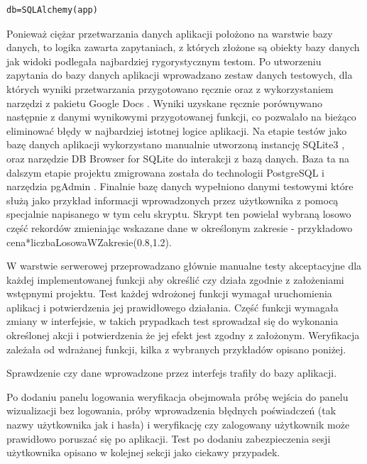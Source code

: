 \documentclass[a4paper, 10pt, twoside, openright]{report}
\begin{document}
\begin{large}
\begin{minipage}{\textwidth}
\begin{lstlisting}
db=SQLAlchemy(app)\end{lstlisting}
\end{minipage}


\medskip
{Ponieważ ciężar przetwarzania danych aplikacji położono na warstwie bazy 
danych, to logika zawarta zapytaniach, z których złożone są obiekty bazy danych 
jak widoki podlegała najbardziej rygorystycznym testom. Po utworzeniu zapytania 
do bazy danych aplikacji wprowadzano zestaw danych testowych, dla których wyniki
 przetwarzania przygotowano ręcznie oraz z wykorzystaniem narzędzi z pakietu 
Google Docs \cite{googledocs}. Wyniki uzyskane ręcznie porównywano następnie z 
danymi wynikowymi przygotowanej funkcji, co pozwalało na bieżąco eliminować 
błędy w najbardziej istotnej logice aplikacji. Na etapie testów jako bazę danych
 aplikacji wykorzystano manualnie utworzoną instancję SQLite3 \cite{SQLite}, 
oraz narzędzie DB Browser for SQLite \cite{DBBrowser} do interakcji z bazą 
danych. Baza ta na dalszym etapie projektu zmigrowana została do technologii 
PostgreSQL \cite{PostgreSQL} i narzędzia pgAdmin \cite{pgAdmin}. Finalnie bazę 
danych wypełniono danymi testowymi które służą jako przykład informacji 
wprowadzonych przez użytkownika z pomocą specjalnie napisanego w tym celu 
skryptu. Skrypt ten powielał wybraną losowo część rekordów zmieniając wskazane 
dane w określonym zakresie - przykładowo cena*liczbaLosowaWZakresie(0.8,1.2).}

\medskip
{W warstwie serwerowej przeprowadzano głównie manualne testy akceptacyjne dla 
każdej implementowanej funkcji aby określić czy działa zgodnie z założeniami 
wstępnymi projektu. Test każdej wdrożonej funkcji wymagał uruchomienia 
aplikacj i potwierdzenia jej prawidłowego działania. Część funkcji wymagała 
zmiany w interfejsie, w takich prypadkach test sprowadzał się do wykonania 
określonej akcji i potwierdzenia że jej efekt jest zgodny z założonym. 
Weryfikacja zależała od wdrażanej funkcji, kilka z wybranych przykładów opisano 
poniżej.}

{Sprawdzenie czy dane wprowadzone przez interfejs trafiły do bazy aplikacji.}

{Po dodaniu panelu logowania weryfikacja obejmowała próbę wejścia do panelu 
wizualizacji bez logowania, próby wprowadzenia błędnych poświadczeń (tak nazwy 
użytkownika jak i hasła) i weryfikację czy zalogowany użytkownik może prawidłowo
 poruszać się po aplikacji.}
{Test po dodaniu zabezpieczenia sesji użytkownika opisano w kolejnej sekcji jako
 ciekawy przypadek.}


\end{large}
\end{document}
